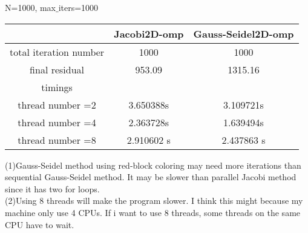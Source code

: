 \documentclass{article}
\begin{document}
N=1000, max$\_$iters=1000
\begin{table}[H]
\begin{tabular}{|c|c|c|}
\hline
&Jacobi2D-omp & Gauss-Seidel2D-omp\\
\hline
total iteration number& 1000& 1000\\
\hline
final residual &953.09 & 1315.16\\
\hline
timings & &\\
 thread number =2&    3.650388s & 3.109721s \\
           thread number =4& 2.363728s & 1.639494s  \\
           thread number =8& 2.910602 s & 2.437863 s\\
\hline
\end{tabular}
\end{table}
\noindent(1)Gauss-Seidel method using red-block coloring may need more iterations than sequential Gauss-Seidel method. It may be slower than parallel Jacobi method since it has two for loops.\\
(2)Using 8 threads will make the program slower. I think this might because my machine only use 4 CPUs. If i want to use 8 threads, some threads on the same CPU have to wait.\\
\end{document}
